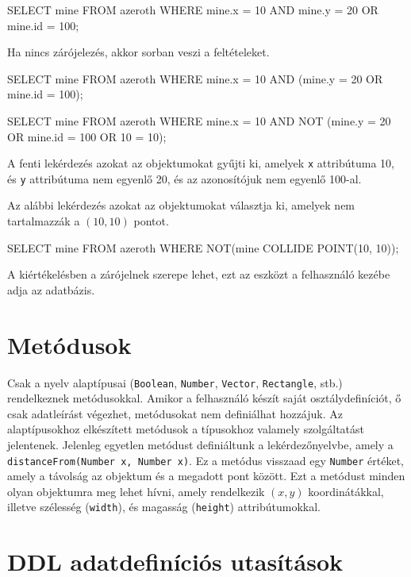 \begin{sql}
SELECT mine FROM azeroth
WHERE mine.x = 10 AND mine.y = 20 OR mine.id = 100;
\end{sql}

Ha nincs zárójelezés, akkor sorban veszi a feltételeket.

\begin{sql}
SELECT mine FROM azeroth
WHERE mine.x = 10 AND (mine.y = 20 OR mine.id = 100);
\end{sql}

\begin{sql}
SELECT mine FROM azeroth
WHERE mine.x = 10 AND NOT (mine.y = 20 OR mine.id = 100 OR 10 = 10);
\end{sql}

A fenti lekérdezés azokat az objektumokat gyűjti ki, amelyek \texttt{x} attribútuma 10, és \texttt{y} attribútuma nem egyenlő 20, és az azonosítójuk nem egyenlő 100-al.

Az alábbi lekérdezés azokat az objektumokat választja ki, amelyek nem tartalmazzák a $(10, 10)$ pontot.
\begin{sql}
SELECT mine FROM azeroth
WHERE NOT(mine COLLIDE POINT(10, 10));
\end{sql}


A kiértékelésben a zárójelnek szerepe lehet, ezt az eszközt a felhasználó kezébe adja az adatbázis.

\section{Metódusok}

Csak a nyelv alaptípusai (\texttt{Boolean}, \texttt{Number}, \texttt{Vector}, \texttt{Rectangle}, stb.) rendelkeznek metódusokkal. Amikor a felhasználó készít saját osztálydefiníciót, ő csak adatleírást végezhet, metódusokat nem definiálhat hozzájuk. Az alaptípusokhoz elkészített metódusok a típusokhoz valamely szolgáltatást jelentenek. Jelenleg egyetlen metódust definiáltunk a lekérdezőnyelvbe, amely a \texttt{distanceFrom(Number x, Number x)}. Ez a metódus visszaad egy \texttt{Number} értéket, amely a távolság az objektum és a megadott pont között. Ezt a metódust minden olyan objektumra meg lehet hívni, amely rendelkezik $(x, y)$ koordinátákkal, illetve szélesség (\texttt{width}), és magasság (\texttt{height}) attribútumokkal.

\section{DDL adatdefiníciós utasítások}

